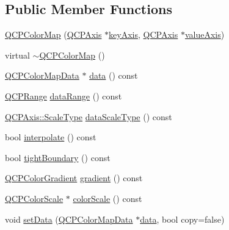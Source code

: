 \subsection*{Public Member Functions}
\begin{DoxyCompactItemize}
\item 
\mbox{\hyperlink{class_q_c_p_color_map_aa37e976d2ee1e2be6c4cd88a64b36215}{Q\+C\+P\+Color\+Map}} (\mbox{\hyperlink{class_q_c_p_axis}{Q\+C\+P\+Axis}} $\ast$\mbox{\hyperlink{class_q_c_p_abstract_plottable_a2cdd6f0dd5e9a979037f86b4000d9cfe}{key\+Axis}}, \mbox{\hyperlink{class_q_c_p_axis}{Q\+C\+P\+Axis}} $\ast$\mbox{\hyperlink{class_q_c_p_abstract_plottable_af47809a644a68ffd955fb30b01fb4f2f}{value\+Axis}})
\item 
virtual \mbox{\hyperlink{class_q_c_p_color_map_ac8a952a40fed62dcee33405b0f4d47ad}{$\sim$\+Q\+C\+P\+Color\+Map}} ()
\item 
\mbox{\hyperlink{class_q_c_p_color_map_data}{Q\+C\+P\+Color\+Map\+Data}} $\ast$ \mbox{\hyperlink{class_q_c_p_color_map_a047d7eb3ae657f93f2f39b5e68b79451}{data}} () const
\item 
\mbox{\hyperlink{class_q_c_p_range}{Q\+C\+P\+Range}} \mbox{\hyperlink{class_q_c_p_color_map_ae478f0a5a016420d66c70cc33d6cda1d}{data\+Range}} () const
\item 
\mbox{\hyperlink{class_q_c_p_axis_a36d8e8658dbaa179bf2aeb973db2d6f0}{Q\+C\+P\+Axis\+::\+Scale\+Type}} \mbox{\hyperlink{class_q_c_p_color_map_ab796f2dccc90fb7a354b6732c33ec9be}{data\+Scale\+Type}} () const
\item 
bool \mbox{\hyperlink{class_q_c_p_color_map_a15d1877883fa463d44bfcbfd6840d4ca}{interpolate}} () const
\item 
bool \mbox{\hyperlink{class_q_c_p_color_map_a53b5d26b28d6027af0fc863f057965db}{tight\+Boundary}} () const
\item 
\mbox{\hyperlink{class_q_c_p_color_gradient}{Q\+C\+P\+Color\+Gradient}} \mbox{\hyperlink{class_q_c_p_color_map_acc4bb87c903607b96c08d2bc34bc24cd}{gradient}} () const
\item 
\mbox{\hyperlink{class_q_c_p_color_scale}{Q\+C\+P\+Color\+Scale}} $\ast$ \mbox{\hyperlink{class_q_c_p_color_map_a9d37d08c467ac645b86fc71a3b151208}{color\+Scale}} () const
\item 
void \mbox{\hyperlink{class_q_c_p_color_map_a5a23e133a20c4ccad35fd32e6c0f9809}{set\+Data}} (\mbox{\hyperlink{class_q_c_p_color_map_data}{Q\+C\+P\+Color\+Map\+Data}} $\ast$\mbox{\hyperlink{class_q_c_p_color_map_a047d7eb3ae657f93f2f39b5e68b79451}{data}}, bool copy=false)
\item 

\end{DoxyCompactItemize}
